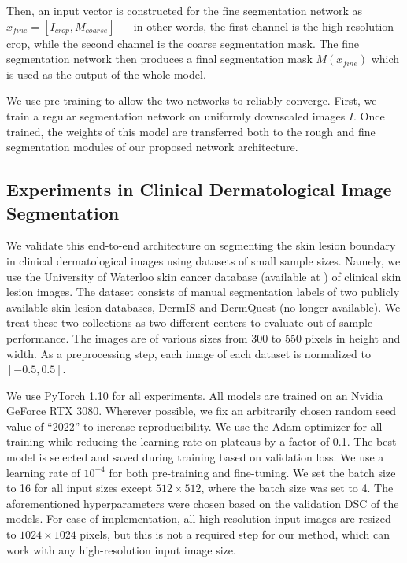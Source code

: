 Then, an input vector is constructed for the fine segmentation network as $x_{fine} = [I_{crop}, M_{coarse}]$ --- in other words, the first channel is the high-resolution crop, while the second channel is the coarse segmentation mask. The fine segmentation network then produces a final segmentation mask $M(x_{fine})$ which is used as the output of the whole model.

We use pre-training to allow the two networks to reliably converge. First, we train a regular segmentation network on uniformly downscaled images $I$. Once trained, the weights of this model are transferred both to the rough and fine segmentation modules of our proposed network architecture.

\subsection{Experiments in Clinical Dermatological Image Segmentation}

We validate this end-to-end architecture on segmenting the skin lesion boundary in clinical dermatological images using datasets of small sample sizes. Namely, we use the University of Waterloo skin cancer database \cite{waterloo} (available at \cite{uwaterlooSkinCancer}) of clinical skin lesion images. The dataset consists of manual segmentation labels of two publicly available skin lesion databases, DermIS \cite{dermisDermIS} and DermQuest (no longer available). We treat these two collections as two different centers to evaluate out-of-sample performance. The images are of various sizes from 300 to 550 pixels in height and width. As a preprocessing step, each image of each dataset is normalized to $[-0.5, 0.5]$.

We use PyTorch 1.10 for all experiments. All models are trained on an Nvidia GeForce RTX 3080. Wherever possible, we fix an arbitrarily chosen random seed value of ``2022'' to increase reproducibility. We use the Adam optimizer for all training while reducing the learning rate on plateaus by a factor of 0.1. The best model is selected and saved during training based on validation loss. We use a learning rate of $10^{-4}$ for both pre-training and fine-tuning. We set the batch size to 16 for all input sizes except $512 \times 512$, where the batch size was set to 4. The aforementioned hyperparameters were chosen based on the validation DSC of the models. For ease of implementation, all high-resolution input images are resized to $1024 \times 1024$ pixels, but this is not a required step for our method, which can work with any high-resolution input image size.

